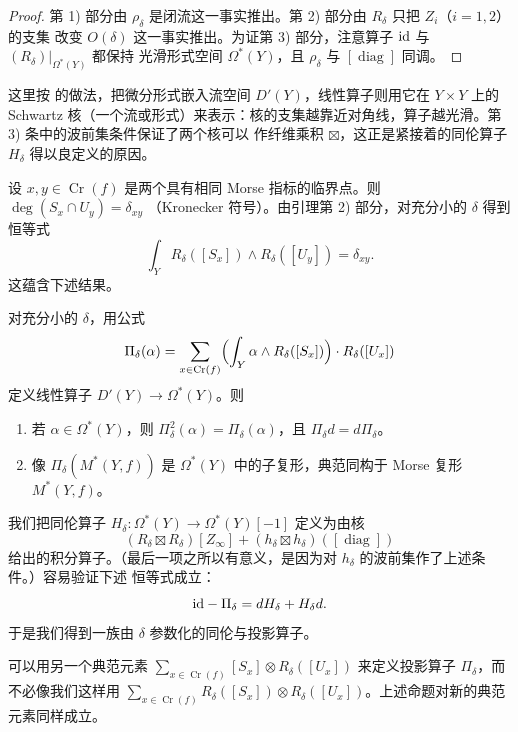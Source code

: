 \begin{proof}
第 1) 部分由 $\rho_\delta$ 是闭流这一事实推出。第 2) 部分由 $R_\delta$ 只把 $Z_i$（$i=1,2$）的支集
改变 $O(\delta)$ 这一事实推出。为证第 3) 部分，注意算子 $\mathrm{id}$ 与 $(R_\delta)|_{\Omega^*(Y)}$ 都保持
光滑形式空间 $\Omega^*(Y)$，且 $\rho_\delta$ 与 $[\operatorname{diag}]$ 同调。
\end{proof}

\begin{yizhu}[流与 Schwartz 核]
这里按 \cite{HL} 的做法，把微分形式嵌入流空间 $D'(Y)$，线性算子则用它在 $Y\times Y$ 上的 Schwartz
核（一个流或形式）来表示：核的支集越靠近对角线，算子越光滑。第 3) 条中的波前集条件保证了两个核可以
作纤维乘积 $\boxtimes$，这正是紧接着的同伦算子 $H_\delta$ 得以良定义的原因。
\end{yizhu}

设 $x,y\in\operatorname{Cr}(f)$ 是两个具有相同 Morse 指标的临界点。则 $\deg(S_x\cap U_y)=\delta_{xy}$
（Kronecker 符号）。由引理第 2) 部分，对充分小的 $\delta$ 得到恒等式
\[
  \int_Y R_\delta([S_x])\wedge R_\delta([U_y])=\delta_{xy}.
\]
这蕴含下述结果。

\begin{prp}
对充分小的 $\delta$，用公式
\[
  \Pi_\delta(\alpha)=\sum_{x\in\operatorname{Cr}(f)}\Bigl(\int_Y\alpha\wedge R_\delta([S_x])\Bigr)
  \cdot R_\delta([U_x])
\]
定义线性算子 $D'(Y)\to\Omega^*(Y)$。则
\begin{enumerate}[label=\arabic*),leftmargin=2.6em]
  \item 若 $\alpha\in\Omega^*(Y)$，则 $\Pi_\delta^2(\alpha)=\Pi_\delta(\alpha)$，且
  $\Pi_\delta d=d\Pi_\delta$。
  \item 像 $\Pi_\delta(M^*(Y,f))$ 是 $\Omega^*(Y)$ 中的子复形，典范同构于 Morse 复形
  $M^*(Y,f)$。
\end{enumerate}
\end{prp}

我们把同伦算子 $H_\delta:\Omega^*(Y)\to\Omega^*(Y)[-1]$ 定义为由核
\[
  (R_\delta\boxtimes R_\delta)[Z_\infty]+(h_\delta\boxtimes h_\delta)([\operatorname{diag}])
\]
给出的积分算子。（最后一项之所以有意义，是因为对 $h_\delta$ 的波前集作了上述条件。）容易验证下述
恒等式成立：
\[
  \mathrm{id}-\Pi_\delta=dH_\delta+H_\delta d.
\]
于是我们得到一族由 $\delta$ 参数化的同伦与投影算子。

\begin{rmk}
可以用另一个典范元素 $\sum_{x\in\operatorname{Cr}(f)}[S_x]\otimes R_\delta([U_x])$ 来定义投影算子
$\Pi_\delta$，而不必像我们这样用
$\sum_{x\in\operatorname{Cr}(f)}R_\delta([S_x])\otimes R_\delta([U_x])$。上述命题对新的典范元素同样成立。
\end{rmk}

